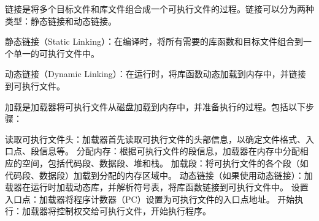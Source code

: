 \documentclass[UTF8]{article}
\begin{document}
链接是将多个目标文件和库文件组合成一个可执行文件的过程。链接可以分为两种类型：静态链接和动态链接。

静态链接（Static Linking）：在编译时，将所有需要的库函数和目标文件组合到一个单一的可执行文件中。

动态链接（Dynamic Linking）：在运行时，将库函数动态加载到内存中，并链接到可执行文件。

加载是加载器将可执行文件从磁盘加载到内存中，并准备执行的过程。包括以下步骤：

读取可执行文件头：加载器首先读取可执行文件的头部信息，以确定文件格式、入口点、段信息等。
分配内存：根据可执行文件的段信息，加载器在内存中分配相应的空间，包括代码段、数据段、堆和栈。
加载段：将可执行文件的各个段（如代码段、数据段）加载到分配的内存区域中。
动态链接（如果使用动态链接）：加载器在运行时加载动态库，并解析符号表，将库函数链接到可执行文件中。
设置入口点：加载器将程序计数器（PC）设置为可执行文件的入口点地址。
开始执行：加载器将控制权交给可执行文件，开始执行程序。
\end{document}
